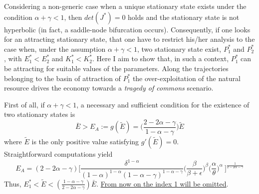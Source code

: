 Considering a non-generic case when a unique stationary state exists under the condition $\alpha+\gamma<1$, then $det(J^*)=0$ holds and the stationary state is not hyperbolic (in fact, a saddle-node bifurcation occurs). Consequently, if one looks for an attracting stationary state, that one have to restrict his/her analysis to the case when, under the assumption $\alpha+\gamma<1$, two stationary state exist, $P_1^*$ and $P_2^*$, with $E_1^* < E_2^*$ and $K_1^* < K_2^*$. Here I aim to show that, in such a context, $P_1^*$ can be attracting for suitable values of the parameters. Along the trajectories belonging to the basin of attraction of $P_1^*$ the over-exploitation of the natural resource drives the economy towards a \textit{tragedy of commons} scenario.

First of all, if $\alpha+\gamma<1$, a necessary and sufficient condition for the existence of two stationary states is
\begin{equation}
	\bar{E}>E_A := g(\tilde{E})=\Bigg(\frac{2-2\alpha-\gamma}{1-\alpha-\gamma}\Bigg) \tilde{E}
\end{equation}
where $\tilde{E}$ is the only positive value satisfying $g'(\tilde{E})=0$. \\
Straightforward computations yield 
\begin{equation} \label{eqn:E_A}
	E_A =(2-2\alpha-\gamma)\Bigg[\frac{\delta^{1-\alpha}}{(1-\alpha)^{1-\alpha}(1-\alpha-\gamma)^{1-\alpha-\gamma}} \Bigg(\frac{\beta}{\beta+\epsilon}\Bigg)^{\beta} \Bigg(\frac{\alpha}{\theta}\Bigg)^{\alpha}\ \Bigg]^{\frac{1}{2-2\alpha-\gamma}}
\end{equation}
Thus, $E_1^*<\tilde{E}<(\frac{1-\alpha-\gamma}{2-2\alpha-\gamma})\bar{E}$.
\underline{From now on the index 1 will be omitted}. 

